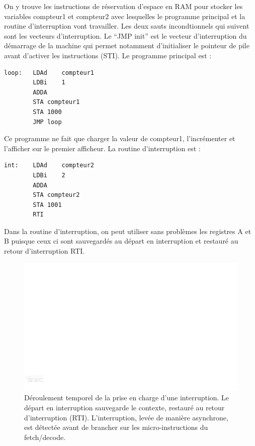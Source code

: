 On y trouve les instructions de réservation d'espace en RAM pour stocker les variables compteur1 et compteur2 avec lesquelles le programme principal et la routine d'interruption vont travailler. Les deux sauts incondtionnels qui suivent sont les vecteurs d'interruption. Le ``JMP init'' est le vecteur d'interruption du démarrage de la machine qui permet notamment d'initialiser le pointeur de pile avant d'activer les instructions (STI). Le programme principal est :
\begin{verbatim}
loop:	LDAd	compteur1
        LDBi	1
        ADDA
        STA	compteur1
        STA	1000
        JMP	loop
\end{verbatim}
Ce programme ne fait que charger la valeur de compteur1, l'incrémenter et l'afficher sur le premier afficheur. La routine d'interruption est :
\begin{verbatim}
int:	LDAd	compteur2	
        LDBi	2
        ADDA
        STA	compteur2
        STA	1001
        RTI
\end{verbatim}
Dans la routine d'interruption, on peut utiliser sans problèmes les registres A et B puisque ceux ci sont sauvegardés au départ en interruption et restauré au retour d'interruption RTI. 

\begin{figure}[htbp]
\includegraphics[width=\linewidth]{Figs/irq_bouton_temps.pdf}
\caption{\label{fig:interrupt_bouton_temps} Déroulement temporel de la prise en charge d'une interruption. Le départ en interruption sauvegarde le contexte, restauré au retour d'interruption (RTI). L'interruption, levée de manière asynchrone, est détectée avant de brancher sur les micro-instructions du fetch/decode.}
\end{figure}

